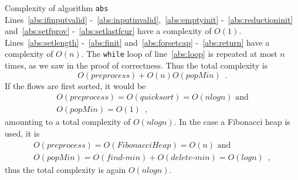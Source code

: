 \begin{sepproof}{Complexity of algorithm \texttt{abs}} \ \\
  Lines~\ref{abs:ifinputvalid} -~\ref{abs:inputinvalid},~\ref{abs:emptyinit} -~\ref{abs:reductioninit} and~\ref{abs:setfprov}
  -~\ref{abs:setlastfcur} have a complexity of $O\left(1\right)$. Lines~\ref{abs:setlength} -~\ref{abs:finit}
  and~\ref{abs:forsetcap} -~\ref{abs:return} have a complexity of $O\left(n\right)$. The \texttt{while} loop of
  line~\ref{abs:loop} is repeated at most $n$ times, as we saw in the proof of correctness. Thus the total complexity is
  \begin{equation*}
    O\left(preprocess\right) + O\left(n\right)O\left(popMin\right) \enspace.
  \end{equation*}
  If the flows are first sorted, it would be
  \begin{equation*}
  \begin{gathered}
    O\left(preprocess\right) = O\left(quicksort\right) = O\left(nlogn\right) \mbox{ and} \\
    O\left(popMin\right) = O\left(1\right) \enspace,
  \end{gathered}
  \end{equation*}
  amounting to a total complexity of $O\left(nlogn\right)$. In the case a Fibonacci heap is used, it is
  \begin{equation*}
  \begin{gathered}
    O\left(preprocess\right) = O\left(FibonacciHeap\right) = O\left(n\right) \mbox{ and} \\
    O\left(popMin\right) = O\left(find\mbox{-}min\right) + O\left(delete\mbox{-}min\right) = O\left(logn\right) \enspace,
  \end{gathered}
  \end{equation*}
  thus the total complexity is again $O\left(nlogn\right)$.
\end{sepproof}
